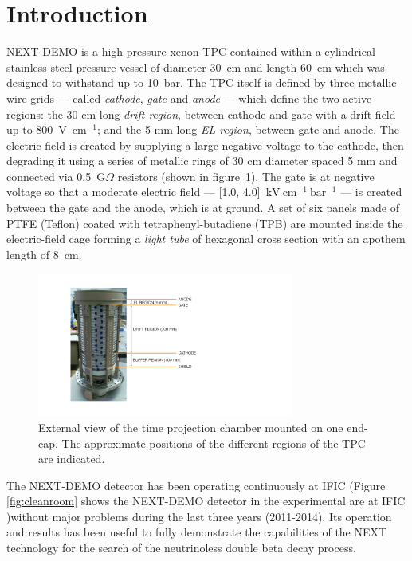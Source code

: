 \section{Introduction}
NEXT-DEMO is a high-pressure xenon TPC contained within a cylindrical stainless-steel pressure vessel of diameter 30~cm and length 60~cm which was designed to withstand up to 10~bar. The TPC itself is defined by three metallic wire grids --- called \emph{cathode}, \emph{gate} and \emph{anode} --- which define the two active regions: the 30-cm long \emph{drift region}, between cathode and gate with a  drift field up to 800~V~cm$^{-1}$; and the 5 mm long \emph{EL region}, between gate and anode.  The electric field is created by supplying a large negative voltage to the cathode, then degrading it using a series of metallic rings of 30 cm diameter spaced 5 mm and connected via 0.5~G$\Omega$ resistors (shown in figure~\ref{fig:TPC}).  The gate is at negative voltage so that a moderate electric field --- [1.0, 4.0]~$\mathrm{kV~cm^{-1}~bar^{-1}}$ --- is created between the gate and the anode, which is at ground. A set of six panels made of PTFE (Teflon) coated with tetraphenyl-butadiene (TPB) are mounted inside the electric-field cage forming a \emph{light tube} of hexagonal cross section with an apothem length of 8~cm. 


\begin{figure}
\centering
\includegraphics[width=0.75\textwidth]{img/FieldCage.pdf}
\caption{External view of the time projection chamber mounted on one end-cap. The approximate positions of the different regions of the TPC are indicated.} \label{fig:TPC}
\end{figure}


The NEXT-DEMO detector has been operating continuously at IFIC (Figure \ref{fig:cleanroom} shows the NEXT-DEMO detector in the experimental are at IFIC )without major problems during the last three years (2011-2014). Its operation and results has been useful to fully demonstrate the capabilities of the NEXT technology for the search of the neutrinoless double beta decay process.


